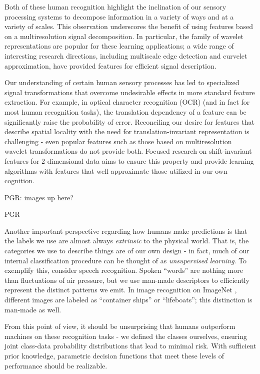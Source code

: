 \documentclass[12pt]{article}
\begin{document}
Both of these human recognition highlight the inclination of our sensory processing systems to decompose information in a variety of ways and at a variety of scales. This observation underscores the benefit of using features based on a multiresolution signal decomposition. In particular, the family of wavelet representations \cite{mallat-wavtour} are popular for these learning applications; a wide range of interesting research directions, including multiscale edge detection and curvelet approximation, have provided features for efficient signal description. 

Our understanding of certain human sensory processes has led to specialized signal transformations that overcome undesirable effects in more standard feature extraction. For example, in optical character recognition (OCR) (and in fact for most human recognition tasks), the translation dependency of a feature can be significantly raise the probability of error. Reconciling our desire for features that describe spatial locality with the need for translation-invariant representation is challenging - even popular features such as those based on multiresolution wavelet transformations \cite{mallat-multires} do not provide both. Focused research on shift-invariant features for 2-dimensional data \cite{marco} aims to ensure this property and provide learning algorithms with features that well approximate those utilized in our own cognition.

PGR: images up here?

PGR

Another important perspective regarding how humans make predictions is that the labels we use are almost always \emph{extrinsic} to the physical world. That is, the categories we use to describe things are of our own design - in fact, much of our internal classification procedure can be thought of as \emph{unsupervised learning}. To exemplify this, consider speech recognition. Spoken ``words'' are nothing more than fluctuations of air pressure, but we use man-made descriptors to efficiently represent the distinct patterns we emit. In image recognition on ImageNet \cite{krizhevsky}, different images are labeled as ``container ships'' or ``lifeboats''; this distinction is man-made as well.

From this point of view, it should be unsurprising that humans outperform machines on these recognition tasks - we defined the classes ourselves, ensuring joint class-data probability distributions that lead to minimal risk. With sufficient prior knowledge, parametric decision functions that meet these levels of performance should be realizable. 
\end{document}
